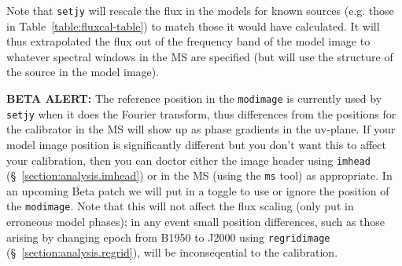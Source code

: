 Note that {\tt setjy} will rescale the flux in the models for known
sources (e.g. those in Table~\ref{table:fluxcal-table}) to match those
it would have calculated.  It will thus extrapolated the flux out of
the frequency band of the model image to whatever spectral windows
in the MS are specified (but will use the structure of the source
in the model image).

{\bf BETA ALERT:} The reference position in the {\tt modimage} is 
currently used by {\tt setjy} when it does the Fourier transform,
thus differences from the positions for the calibrator in the MS
will show up as phase gradients in the uv-plane.  If your model
image position is significantly different but you don't want this
to affect your calibration, then you can doctor either the image
header using {\tt imhead} (\S~\ref{section:analysis.imhead})
or in the MS (using the {\tt ms} tool) as appropriate.  In an upcoming
Beta patch we will put in a toggle to use or ignore the position of
the {\tt modimage}.  Note that this will not affect the flux scaling
(only put in erroneous model phases); in any event small position
differences, such as those arising by changing epoch from B1950 to
J2000 using {\tt regridimage} (\S~\ref{section:analysis.regrid}),
will be inconseqential to the calibration.

